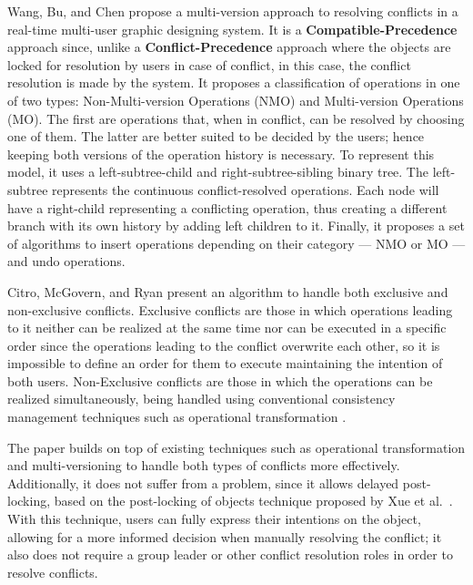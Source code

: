 Wang, Bu, and Chen \cite{Wang2002} propose a multi-version approach to resolving conflicts in a real-time multi-user graphic designing system. It is a \textbf{Compatible-Precedence} approach since, unlike a \textbf{Conflict-Precedence} approach where the objects are locked for resolution by users in case of conflict, in this case, the conflict resolution is made by the system. It proposes a classification of operations in one of two types: Non-Multi-version Operations (NMO) and Multi-version Operations (MO). The first are operations that, when in conflict, can be resolved by choosing one of them. The latter are better suited to be decided by the users; hence keeping both versions of the operation history is necessary.
To represent this model, it uses a left-subtree-child and right-subtree-sibling binary tree. The left-subtree represents the continuous conflict-resolved operations. Each node will have a right-child representing a conflicting operation, thus creating a different branch with its own history by adding left children to it. Finally, it proposes a set of algorithms to insert operations depending on their category --- NMO or MO --- and undo operations.

Citro, McGovern, and Ryan \cite{Citro2007} present an algorithm to handle both exclusive and non-exclusive conflicts. Exclusive conflicts are those in which operations leading to it neither can be realized at the same time nor can be executed in a specific order since the operations leading to the conflict overwrite each other, so it is impossible to define an order for them to execute maintaining the intention of both users. Non-Exclusive conflicts are those in which the operations can be realized simultaneously, being handled using conventional consistency management techniques such as operational transformation \cite{Ellis1989}.

The paper builds on top of existing techniques such as operational transformation and multi-versioning to handle both types of conflicts more effectively. Additionally, it does not suffer from a  problem, since it allows delayed post-locking, based on the post-locking of objects technique proposed by Xue et al.\ \cite{Xue2001}. With this technique, users can fully express their intentions on the object, allowing for a more informed decision when manually resolving the conflict; it also does not require a group leader or other conflict resolution roles in order to resolve conflicts.

